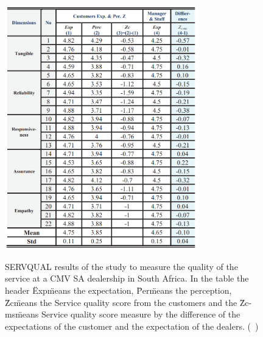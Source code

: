 \begin{figure}[h]
  \caption{SERVQUAL results of the study to measure the quality of the service at a CMV SA dealership in South Africa. In the table the header \"Exp\" means the expectation, \"Per\" means the perception, \"Zc\" means the Service quality score from the customers and the \"Zc-ms\" means Service quality score measure by the difference of the expectations of the customer and the expectation of the dealers. (~\cite{Measuring_After_sales_Service_Quality})}
  \centering
  \includegraphics[width=0.75\textwidth]{figs/SERVQUAL_results}
  \label{fig:SERVQUAL_results}
\end{figure}





